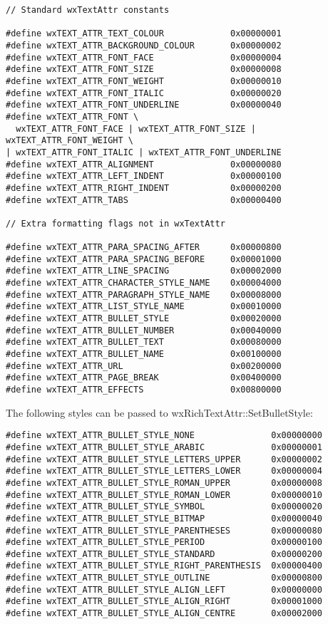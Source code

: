 {\small
\begin{verbatim}
// Standard wxTextAttr constants

#define wxTEXT_ATTR_TEXT_COLOUR             0x00000001
#define wxTEXT_ATTR_BACKGROUND_COLOUR       0x00000002
#define wxTEXT_ATTR_FONT_FACE               0x00000004
#define wxTEXT_ATTR_FONT_SIZE               0x00000008
#define wxTEXT_ATTR_FONT_WEIGHT             0x00000010
#define wxTEXT_ATTR_FONT_ITALIC             0x00000020
#define wxTEXT_ATTR_FONT_UNDERLINE          0x00000040
#define wxTEXT_ATTR_FONT \
  wxTEXT_ATTR_FONT_FACE | wxTEXT_ATTR_FONT_SIZE | wxTEXT_ATTR_FONT_WEIGHT \
| wxTEXT_ATTR_FONT_ITALIC | wxTEXT_ATTR_FONT_UNDERLINE
#define wxTEXT_ATTR_ALIGNMENT               0x00000080
#define wxTEXT_ATTR_LEFT_INDENT             0x00000100
#define wxTEXT_ATTR_RIGHT_INDENT            0x00000200
#define wxTEXT_ATTR_TABS                    0x00000400

// Extra formatting flags not in wxTextAttr

#define wxTEXT_ATTR_PARA_SPACING_AFTER      0x00000800
#define wxTEXT_ATTR_PARA_SPACING_BEFORE     0x00001000
#define wxTEXT_ATTR_LINE_SPACING            0x00002000
#define wxTEXT_ATTR_CHARACTER_STYLE_NAME    0x00004000
#define wxTEXT_ATTR_PARAGRAPH_STYLE_NAME    0x00008000
#define wxTEXT_ATTR_LIST_STYLE_NAME         0x00010000
#define wxTEXT_ATTR_BULLET_STYLE            0x00020000
#define wxTEXT_ATTR_BULLET_NUMBER           0x00040000
#define wxTEXT_ATTR_BULLET_TEXT             0x00080000
#define wxTEXT_ATTR_BULLET_NAME             0x00100000
#define wxTEXT_ATTR_URL                     0x00200000
#define wxTEXT_ATTR_PAGE_BREAK              0x00400000
#define wxTEXT_ATTR_EFFECTS                 0x00800000
\end{verbatim}
}

The following styles can be passed to wxRichTextAttr::SetBulletStyle:

{\small
\begin{verbatim}
#define wxTEXT_ATTR_BULLET_STYLE_NONE               0x00000000
#define wxTEXT_ATTR_BULLET_STYLE_ARABIC             0x00000001
#define wxTEXT_ATTR_BULLET_STYLE_LETTERS_UPPER      0x00000002
#define wxTEXT_ATTR_BULLET_STYLE_LETTERS_LOWER      0x00000004
#define wxTEXT_ATTR_BULLET_STYLE_ROMAN_UPPER        0x00000008
#define wxTEXT_ATTR_BULLET_STYLE_ROMAN_LOWER        0x00000010
#define wxTEXT_ATTR_BULLET_STYLE_SYMBOL             0x00000020
#define wxTEXT_ATTR_BULLET_STYLE_BITMAP             0x00000040
#define wxTEXT_ATTR_BULLET_STYLE_PARENTHESES        0x00000080
#define wxTEXT_ATTR_BULLET_STYLE_PERIOD             0x00000100
#define wxTEXT_ATTR_BULLET_STYLE_STANDARD           0x00000200
#define wxTEXT_ATTR_BULLET_STYLE_RIGHT_PARENTHESIS  0x00000400
#define wxTEXT_ATTR_BULLET_STYLE_OUTLINE            0x00000800
#define wxTEXT_ATTR_BULLET_STYLE_ALIGN_LEFT         0x00000000
#define wxTEXT_ATTR_BULLET_STYLE_ALIGN_RIGHT        0x00001000
#define wxTEXT_ATTR_BULLET_STYLE_ALIGN_CENTRE       0x00002000
\end{verbatim}
}

